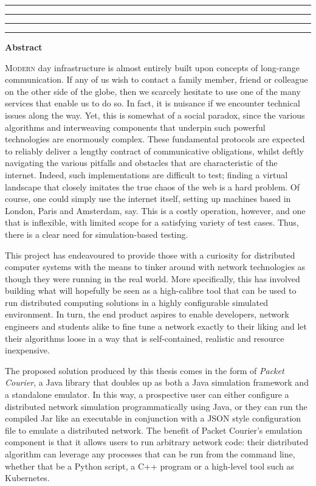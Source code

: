 \thispagestyle{empty}
\hrule\hrule\hrule\hrule %
\begin{center}
    \textbf{\large Abstract}
    \\
\end{center}

\noindent
\lettrine{M}{odern} day infrastructure is almost entirely built upon concepts of long-range communication. If any of
us wish to contact a family member, friend or colleague on the other side of the globe, then we scarcely hesitate to
use one of the many services that enable us to do so. In fact, it is nuisance if we encounter technical issues along
the way. Yet, this is somewhat of a social paradox, since the various algorithms and interweaving components
that underpin such powerful technologies are enormously complex. These fundamental protocols are expected to reliably
deliver a lengthy contract of communicative obligations, whilst deftly navigating the various pitfalls and obstacles
that are characteristic of the internet. Indeed, such implementations are difficult to test; finding a virtual
landscape that closely imitates the true chaos of the web is a hard problem. Of course, one could simply use the
internet itself, setting up machines based in London, Paris and Amsterdam, say. This is a costly operation, however,
and one that is inflexible, with limited scope for a satisfying variety of test cases. Thus, there is a clear need for
simulation-based testing.

This project has endeavoured to provide those with a curiosity for distributed computer systems with the means to
tinker around with network technologies as though they were running in the real world. More specifically, this has
involved building what will hopefully be seen as a high-calibre tool that can be used to run distributed computing
solutions in a highly configurable simulated environment. In turn, the end product aspires to enable developers,
network engineers and students alike to fine tune a network exactly to their liking and let their algorithms loose in
a way that is self-contained, realistic and resource inexpensive.

The proposed solution produced by this thesis comes in the form of \emph{Packet Courier}, a Java library that doubles
up as both a Java simulation framework and a standalone emulator. In this way, a prospective user can either
configure a distributed network simulation programmatically using Java, or they can run the compiled Jar like an
executable in conjunction with a JSON style configuration file to emulate a distributed network. The benefit of
Packet Courier's emulation component is that it allows users to run arbitrary network code: their distributed
algorithm can leverage any processes that can be run from the command line, whether that be a Python script, a
C++ program or a high-level tool such as Kubernetes.

